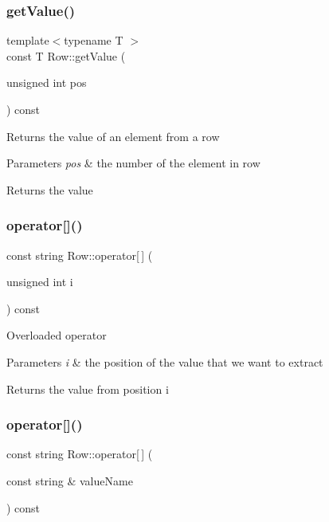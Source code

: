 \subsubsection{\texorpdfstring{getValue()}{getValue()}}
{\footnotesize\ttfamily template$<$typename T $>$ \\
const T Row\+::get\+Value (\begin{DoxyParamCaption}\item[{unsigned int}]{pos }\end{DoxyParamCaption}) const\hspace{0.3cm}{\ttfamily [inline]}}

Returns the value of an element from a row 
\begin{DoxyParams}{Parameters}
{\em pos} & the number of the element in row \\
\hline
\end{DoxyParams}
\begin{DoxyReturn}{Returns}
the value 
\end{DoxyReturn}
\mbox{\label{class_row_a705ecee70126716fbe16337e4a2b8764}} 
\subsubsection{\texorpdfstring{operator[]()}{operator[]()}\hspace{0.1cm}{\footnotesize\ttfamily [1/2]}}
{\footnotesize\ttfamily const string Row\+::operator\mbox{[}$\,$\mbox{]} (\begin{DoxyParamCaption}\item[{unsigned int}]{i }\end{DoxyParamCaption}) const}

Overloaded operator 
\begin{DoxyParams}{Parameters}
{\em i} & the position of the value that we want to extract \\
\hline
\end{DoxyParams}
\begin{DoxyReturn}{Returns}
the value from position i 
\end{DoxyReturn}
\mbox{\label{class_row_a42f23dd69d591da253b7428647f16ff8}} 
\subsubsection{\texorpdfstring{operator[]()}{operator[]()}\hspace{0.1cm}{\footnotesize\ttfamily [2/2]}}
{\footnotesize\ttfamily const string Row\+::operator\mbox{[}$\,$\mbox{]} (\begin{DoxyParamCaption}\item[{const string \&}]{value\+Name }\end{DoxyParamCaption}) const}


